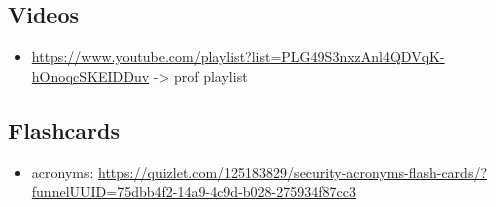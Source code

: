 \documentclass[11pt]{article}
\begin{document}
\subsection{Videos}
\label{sec:orgd95bae1}
\begin{itemize}
\item \url{https://www.youtube.com/playlist?list=PLG49S3nxzAnl4QDVqK-hOnoqcSKEIDDuv} -> prof playlist
\end{itemize}
\subsection{Flashcards}
\label{sec:org6058989}
\begin{itemize}
\item acronyms: \url{https://quizlet.com/125183829/security-acronyms-flash-cards/?funnelUUID=75dbb4f2-14a9-4c9d-b028-275934f87cc3}
\end{itemize}
\end{document}
